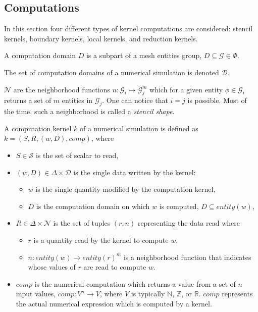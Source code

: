 \subsection{Computations}

In this section four different types of kernel computations are considered: stencil kernels, boundary kernels, local kernels, and reduction kernels.

\medskip
\begin{mydefs}
\item A computation domain $D$ is a subpart of a mesh entities group, $D \subseteq \mathcal{G} \in \Phi$.
\item The set of computation domains of a numerical simulation is denoted $\mathcal{D}$.
\item $\mathcal{N}$ are the neighborhood functions $n: \mathcal{G}_i \mapsto \mathcal{G}_j^m$ which for a given entity $\phi \in \mathcal{G}_i$ returns a set of $m$ entities in $\mathcal{G}_j$. One can notice that $i = j$ is possible. Most of the time, such a neighborhood is called a \emph{stencil shape}.
\end{mydefs}

\begin{mydef}
A computation kernel $k$ of a numerical simulation is defined as $k=(S,R,(w,D),comp)$, where
\begin{itemize}
\item $S \in \mathcal{S}$ is the set of scalar to read,
\item $(w,D) \in \Delta \times \mathcal{D}$ is the single data written by the kernel:
\begin{itemize}
  \item $w$ is the single quantity modified by the computation kernel,
  \item $D$ is the computation domain on which $w$ is computed, $D \subseteq entity(w)$,
\end{itemize}
\item $R \in \Delta \times \mathcal{N}$ is the set of tuples $(r,n)$ representing the data read where
\begin{itemize}
  \item $r$ is a quantity read by the kernel to compute $w$,
  \item $n : entity(w) \rightarrow entity(r)^m$ is a neighborhood function that indicates whose values of $r$ are read to compute $w$.
\end{itemize}
\item $comp$ is the numerical computation which returns a value from a set of $n$ input values, $comp: V^n \rightarrow V$, where $V$ is typically $\mathbb{N}$, $\mathbb{Z}$, or $\mathbb{R}$. $comp$ represents the actual numerical expression which is computed by a kernel.
\end{itemize}
\end{mydef}

